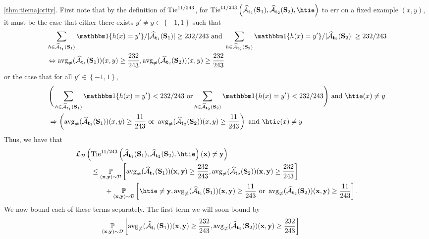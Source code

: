 \begin{proofof}{\cref{thm:tiemajority}.}
First note that by the definition of $\mathrm{Tie}^{11/243}$, for $ \tie^{11/243}\left(\widehat{\cA}_{\rt_{1}}(\rS_{1}),\widehat{\cA}_{\rt_{2}}(\rS_{2}), \htie\right) $ to err on a fixed example $ (x,y) $, it must be the case that either there exists $y' \neq y \in\left\{  -1,1\right\}$ such that
\begin{align*}
& \sum_{h\in \widehat{\cA}_{\rt_{1}}(\rS_{1})}\ind\{h(x)=y'\}/|\widehat{\cA}_{\rt_{1}}(\rS_{1})|\geq 232/243 \text{  and } \sum_{h\in \widehat{\cA}_{\rt_{2}}(\rS_{2})}\ind\{h(x)=y'\}/|\widehat{\cA}_{\rt_{2}}(\rS_{2})|\geq 232/243
 \\
& \Leftrightarrow \avg(\widehat{\cA}_{\rt_{1}}(\rS_{1}))(x,y)\geq \frac{232}{243},\avg(\widehat{\cA}_{\rt_{2}}(\rS_{2}))(x,y)\geq \frac{232}{243}
\end{align*} 
or the case that for all $y'\in\left\{  -1,1\right\}$,
\begin{align*}
& \Bigg( \sum_{h\in \widehat{\cA}_{\rt_{1}}(\rS_{1})}\ind\{h(x)=y'\}< 232/243 \text{ or} \sum_{h\in \widehat{\cA}_{\rt_{2}}(\rS_{2})}\ind\{h(x)=y'\}< 232/243 \Bigg)  \text{ and } \htie(x)\not=y
    \\
& \Rightarrow  \left( \avg(\widehat{\cA}_{\rt_{1}}(\rS_{1}))(x,y)\geq \frac{11}{243} \text{ or } \avg(\widehat{\cA}_{\rt_{2}}(\rS_{2}))(x,y)\geq \frac{11}{243} \right)  \text{ and } \htie(x)\not=y
\end{align*} 
Thus, we have that   
\begin{align}\label{eq:secondmajority1}
 \ls_{\cD} \Big(& \tie^{11/243}  \left(\widehat{\cA}_{\rt_{1}}(\rS_{1}),\widehat{\cA}_{\rt_{2}}(\rS_{2}), \htie\right)(\rx)\not=\ry\Big) \nonumber 
 \\
& \leq
 \p_{(\rx,\ry)\sim\cD}\left[\avg(\widehat{\cA}_{\rt_{1}}(\rS_{1}))(\rx,\ry)\geq \frac{232}{243},\avg(\widehat{\cA}_{\rt_{2}}(\rS_{2}))(\rx,\ry)\geq \frac{232}{243}\right] \nonumber
 \\
& \qquad  +\p_{(\rx,\ry)\sim\cD}\left[ \htie\not=\ry, \avg(\widehat{\cA}_{\rt_{1}}(\rS_{1}))(\rx,\ry)\geq \frac{11}{243} \text{ or } \avg(\widehat{\cA}_{\rt_{2}}(\rS_{2}))(\rx,\ry)\geq \frac{11}{243}\right]. 
\end{align}
We now bound each of these terms separately. 
The first term we will soon bound by 
\begin{align}\label{eq:secondmajority-1}
& \hspace{-1.7cm} \p_{(\rx,\ry)\sim\cD}\left[\avg(\widehat{\cA}_{\rt_{1}}(\rS_{1}))(\rx,\ry)\geq \frac{232}{243},\avg(\widehat{\cA}_{\rt_{2}}(\rS_{2}))(\rx,\ry)\geq \frac{232}{243}\right] \nonumber  \\ 

\end{align}
\end{proofof}
